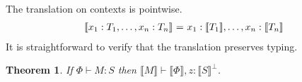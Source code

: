 \documentclass{easychair}
\makeatletter
\newtheorem{theorem}{Theorem}
\newcommand{\ba}{\begin{array}}
\newcommand{\ea}{\end{array}}
\newenvironment{equations}{\[\ba{@{}r@{~}c@{~}l@{}}}{\ea\]}
\newcommand{\key}{\mathsf}
\newcommand{\gvOutputType}[2]{![{#1}].{#2}}
\newcommand{\gvInputType}[2]{?[{#1}].{#2}}
\newcommand{\cpj}[2]{{#1} \vdash {#2}}
\newcommand{\gvj}[3]{{#1} \vdash {#2} : {#3}}
\newcommand{\gvSendType}[2]{\key{sendType}~{#1}~{#2}}
\newcommand{\gvReceiveType}[2]{\key{receiveType}~{#1}~{#2}}
\newcommand{\cpLink}[2]{{#1} \leftrightarrow {#2}}
\newcommand{\cpCut}[3]{\nu {#1}.({#2} \mid {#3})}
\newcommand{\cpSendType}[3]{{#1}[{#2}].{#3}}
\newcommand{\cpReceiveType}[3]{{#1}({#2}).{#3}}
\newcommand{\cpDual}[1]{{#1}^\bot}
\newcommand{\cpExists}[2]{\exists {#1}.{#2}}
\newcommand{\cpForall}[2]{\forall {#1}.{#2}}
\newcommand{\FV}[1]{\mathit{FV}(#1)}
\newcommand{\subst}[3]{{#1}[{#2}/{#3}]}
\newcommand{\hgvcp}[1]{\llbracket{#1}\rrbracket}
\makeatother
\begin{document}

The translation on contexts is pointwise.
\begin{equations}
\hgvcp{x_1:T_1, \dots, x_n:T_n} &=& x_1:\hgvcp{T_1}, \dots, x_n:\hgvcp{T_n} \\
\end{equations}%
It is straightforward to verify that the translation preserves typing.
\begin{theorem}
If $\gvj{\Phi}{M}{S}$ then $\cpj{\hgvcp{M}}{\hgvcp{\Phi},z:\cpDual{\hgvcp{S}}}$.
\end{theorem}
\end{document}
